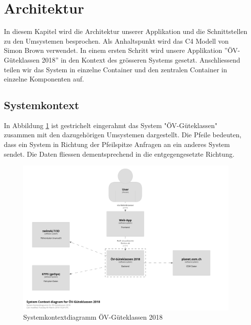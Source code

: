 
\section{Architektur}
\label{Architektur}

In diesem Kapitel wird die Architektur unserer Applikation und die Schnittstellen zu den Umsystemen besprochen.
Als Anhaltspunkt wird das C4 Modell \cite{c4model} von Simon Brown verwendet.
In einem ersten Schritt wird unsere Applikation ''ÖV-Güteklassen 2018'' in den Kontext des grösseren Systems gesetzt.
Anschliessend teilen wir das System  in einzelne Container und den zentralen Container  in einzelne Komponenten auf.

\subsection{Systemkontext}
\label{Architektur:Systemkontext}

In Abbildung \ref{fig:system-context-diagram} ist gestrichelt eingerahmt das System "ÖV-Güteklassen" zusammen mit den dazugehörigen Umsystemen dargestellt.
Die Pfeile bedeuten, dass ein System in Richtung der Pfeilspitze Anfragen an ein anderes System sendet.
Die Daten fliessen dementsprechend in die entgegengesetzte Richtung.

\begin{figure}[ht]
    \centering
    \includegraphics[width=1\linewidth]{projectdoc/img/systemcontext-diagram.png}
    \caption[Systemkontextdiagramm]{Systemkontextdiagramm ÖV-Güteklassen 2018}
    \label{fig:system-context-diagram}
\end{figure}

